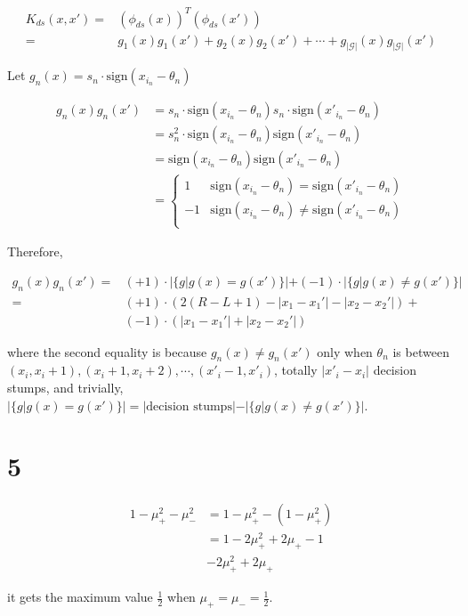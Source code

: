 \documentclass[fleqn,a4paper,12pt]{article}
\begin{document}
\begin{align*}
  K_{ds}(x, x')
  =& (\phi_{ds}(x))^T(\phi_{ds}(x')) \\
  =& g_1(x)g_1(x') + g_2(x)g_2(x') + \cdots + g_{|\mathcal{G}|}(x)g_{|\mathcal{G}|}(x')
\end{align*}

Let $g_n(x) = s_n \cdot \mathrm{sign}(x_{i_n} - \theta_n)$

\begin{align*}
  g_n(x)g_n(x')
  &= s_n \cdot \mathrm{sign}(x_{i_n} - \theta_n) s_n \cdot \mathrm{sign}(x'_{i_n} - \theta_n) \\
  &= s_n^2 \cdot \mathrm{sign}(x_{i_n} - \theta_n) \mathrm{sign}(x'_{i_n} - \theta_n) \\  
  &= \mathrm{sign}(x_{i_n} - \theta_n) \mathrm{sign}(x'_{i_n} - \theta_n) \\
  &=\begin{cases}
    1 & \mathrm{sign}(x_{i_n} - \theta_n) = \mathrm{sign}(x'_{i_n} - \theta_n) \\
    -1 & \mathrm{sign}(x_{i_n} - \theta_n) \ne \mathrm{sign}(x'_{i_n} - \theta_n) \\
  \end{cases}
\end{align*}

Therefore, 

\begin{align*}
  g_n(x)g_n(x')
  =& (+1) \cdot |\{g | g(x) = g(x')\}| + (-1) \cdot |\{g | g(x) \ne g(x')\}| \\
  =& (+1) \cdot (2(R - L + 1) - |x_1 - x_1'| - |x_2 - x_2'|) + \\
    & (-1) \cdot (|x_1 - x_1'| + |x_2 - x_2'|)
\end{align*}

where the second equality is because $g_n(x) \ne g_n(x')$ only when $\theta_n$ is between $(x_i, x_i + 1), (x_i + 1, x_i + 2), \cdots, (x'_i - 1, x'_i)$, totally $|x'_i - x_i|$ decision stumps, and trivially, $|\{g | g(x) = g(x')\}| = |\text{decision stumps}| - |\{g | g(x) \ne g(x')\}|$.

\section*{5}

\begin{align*}
  1 - \mu_+^2 - \mu_-^2
  &= 1 - \mu_+^2 - (1 - \mu_+^2) \\
  &= 1 - 2 \mu_+^2 + 2 \mu_+  - 1 \\
  & -2 \mu_+^2 + 2 \mu_+
\end{align*}

it gets the maximum value $\frac{1}{2}$ when $\mu_+ = \mu_- = \frac{1}{2}$.
\end{document}
